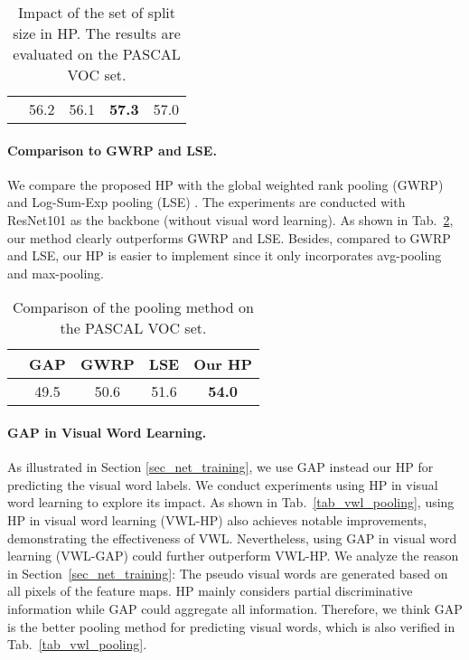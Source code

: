 \begin{table}[h]
  \caption{Impact of the set of split size in HP. The results are evaluated on the PASCAL VOC  set.}
  \label{tab_r}
  \centering
  \begin{tabular}{c|cccc}
    \toprule
         &  &  &    &  \\ \midrule
     & 56.2    & 56.1      & \textbf{57.3} & 57.0          \\ \bottomrule
  \end{tabular}
\end{table}

\paragraph{\textbf{Comparison to GWRP and LSE.}}
\par We compare the proposed HP with the global weighted rank pooling (GWRP) \citep{kolesnikov2016seed} and Log-Sum-Exp pooling (LSE) \citep{pinheiro2015image}. The experiments are conducted with ResNet101 \citep{he2016deep} as the backbone (without visual word learning). As shown in Tab.~\ref{tab_pooling}, our method clearly outperforms GWRP and LSE. Besides, compared to GWRP and LSE, our HP is easier to implement since it only incorporates avg-pooling and max-pooling.

\begin{table}[h]
  \caption{Comparison of the pooling method on the PASCAL VOC  set.}
  \label{tab_pooling}
  \centering
  \begin{tabular}{c|cccc}
    \toprule
            & GAP  & GWRP & LSE  & Our HP        \\ \midrule
     & 49.5 & 50.6 & 51.6 & \textbf{54.0} \\ \bottomrule
  \end{tabular}
\end{table}

\paragraph{\textbf{GAP in Visual Word Learning.}}
As illustrated in Section \ref{sec_net_training}, we use GAP instead our HP for predicting the visual word labels. We conduct experiments using HP in visual word learning to explore its impact. As shown in Tab.~\ref{tab_vwl_pooling}, using HP in visual word learning (VWL-HP) also achieves notable improvements, demonstrating the effectiveness of VWL. Nevertheless, using GAP in visual word learning (VWL-GAP) could further outperform VWL-HP. We analyze the reason in Section~\ref{sec_net_training}: The pseudo visual words are generated based on all pixels of the feature maps. HP mainly considers partial discriminative information while GAP could aggregate all information. Therefore, we think GAP is the better pooling method for predicting visual words, which is also verified in Tab.~\ref{tab_vwl_pooling}.

